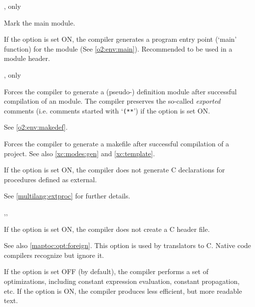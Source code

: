 \begin{description}
        \MLBegin{}\ModeC{}, \ot{} only\MLEnd{} \header

        Mark the \ot{} main module.

        If the option is set ON, the compiler generates a
        program entry point (`main' function) for the \ot{}
        module (See \ref{o2:env:main}).
        Recommended to be used in a module header.

        \MLBegin{}\ModeC{},\ot{} only\MLEnd{}

        Forces the \ot{}
        compiler to generate a (pseudo-) definition module after
        successful compilation of an \ot{} module. The compiler
        preserves the so-called {\em exported} comments
        (i.e. comments started with `\verb|(**|')
        if the  option is set ON.

        See \ref{o2:env:makedef}.

        \MLBegin{}\ModeP{}\MLEnd{}

        Forces the compiler to generate a makefile after
        successful compilation of a project.
        See also \ref{xc:modes:gen} and \ref{xc:template}.

\ifgenc
{}
        \MLBegin{}\ModeC{}\MLEnd{} \inline

        If the option is set ON, the compiler does not generate C declarations for
        procedures defined as external.

        See \ref{multilang:extproc} for further details.
\fi

        \MLBegin{}\ModeC{},\ModeM{},\ModeP{}\MLEnd{} \header

\ifgenc
        If the option is set ON, the compiler does not create a C
        header file.

        See also \ref{maptoc:opt:foreign}.
\else
	This option is used by translators to C. Native code compilers
        recognize but ignore it.
\fi

\ifgenc
{}
\else
{}
\fi
        \MLBegin{}\ModeC{}\MLEnd{}
\ifgenc
        If the option is set OFF (by default), the compiler performs a
        set of optimizations, including constant expression evaluation,
        constant propagation, etc. If the option is ON, the compiler
        produces less efficient, but more readable text.


\end{description}
